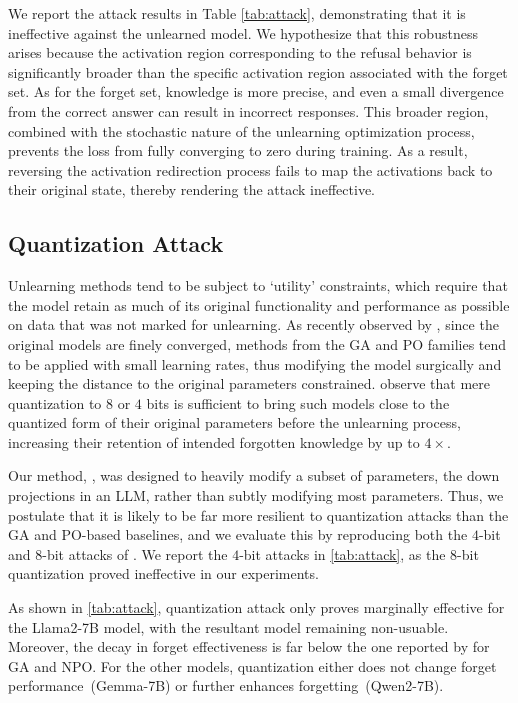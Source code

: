 We report the attack results in Table \ref{tab:attack}, demonstrating that it is ineffective against the \lunar unlearned model. We hypothesize that this robustness arises because the activation region corresponding to the refusal behavior is significantly broader than the specific activation region associated with the forget set. As for the forget set, knowledge is more precise, and even a small divergence from the correct answer can result in incorrect responses. This broader region, combined with the stochastic nature of the unlearning optimization process, prevents the loss from fully converging to zero during training. As a result, reversing the activation redirection process fails to map the activations back to their original state, thereby rendering the attack ineffective.

\vspace{-2mm}
\subsection{Quantization Attack} \label{sec:quantization_attack}

Unlearning methods tend to be subject to `utility' constraints, which require that the model retain as much of its original functionality and performance as possible on data that was not marked for unlearning. As recently observed by \citet{zhang2024does}, since the original models are finely converged, methods from the GA and PO families tend to be applied with small learning rates, thus modifying the model surgically and keeping the distance to the original parameters constrained. \citet{zhang2024does} observe that mere quantization to $8$ or $4$ bits is sufficient to bring such models close to the quantized form of their original parameters before the unlearning process, increasing their retention of intended forgotten knowledge by up to $4 \times$.

Our method, \lunar, was designed to heavily modify a subset of parameters, the down projections in an LLM, rather than subtly modifying most parameters. Thus, we postulate that it is likely to be far more resilient to quantization attacks than the GA and PO-based baselines, and we evaluate this by reproducing both the $4$-bit and $8$-bit attacks of \citet{zhang2024does}. We report the $4$-bit attacks in \cref{tab:attack}, as the $8$-bit quantization proved ineffective in our experiments.

As shown in \cref{tab:attack}, quantization attack only proves marginally effective for the Llama2-7B model, with the resultant model remaining non-usuable. Moreover, the decay in forget effectiveness is far below the one reported by \citet{zhang2024does} for GA and NPO. For the other models, quantization either does not change forget performance~(Gemma-7B) or further enhances forgetting~(Qwen2-7B).


